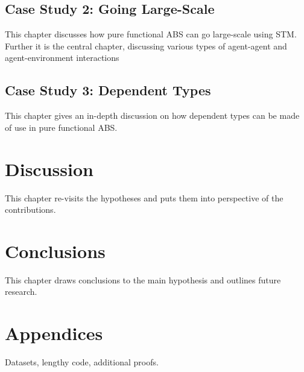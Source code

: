 \subsection{Case Study 2: Going Large-Scale}
This chapter discusses how pure functional ABS can go large-scale using STM. Further it is the central chapter, discussing various types of agent-agent and agent-environment interactions

%

\subsection{Case Study 3: Dependent Types}
This chapter gives an in-depth discussion on how dependent types can be made of use in pure functional ABS.

\section{Discussion}
This chapter re-visits the hypotheses and puts them into perspective of the contributions.

\section{Conclusions}
This chapter draws conclusions to the main hypothesis and outlines future research.

\section{Appendices}
Datasets, lengthy code, additional proofs.
